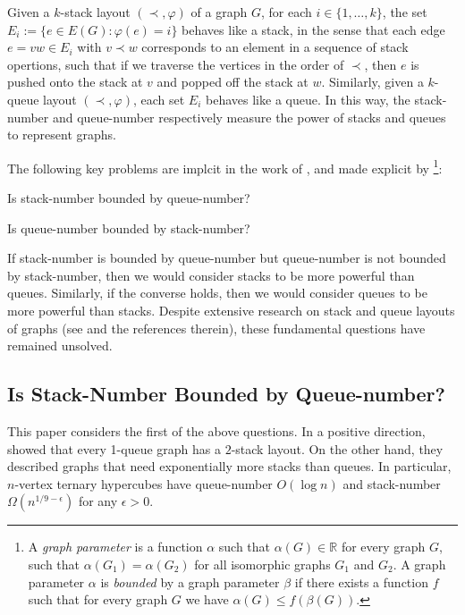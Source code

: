 \documentclass[kpfonts]{patmorin}
\renewcommand{\leq}{\leqslant}
\begin{document}
Given a $k$-stack layout $(\prec,\varphi)$ of a graph $G$, for each $i\in\{1,\dots,k\}$, the set $E_i:= \{e\in E(G):\varphi(e)=i\}$ behaves like a stack, in the sense that each edge $e=vw \in E_i$ with $v\prec w$ corresponds to an element in a sequence of stack opertions, such that if we traverse the vertices in the order of $\prec$, then $e$ is pushed onto the stack at $v$ and popped off the stack at $w$. Similarly, given a $k$-queue layout $(\prec,\varphi)$, each set $E_i$ behaves like a queue. In this way, the stack-number and queue-number  respectively measure the power of stacks and queues to represent graphs.


The following key problems are implcit in the work of \citet{HLR92}, and made explicit by \citet{DujWoo05}
\footnote{A \emph{graph parameter} is a function $\alpha$ such that $\alpha(G)\in\mathbb{R}$ for every graph $G$, such that $\alpha(G_1)=\alpha(G_2)$ for all isomorphic graphs $G_1$ and $G_2$. A graph parameter $\alpha$ is \textit{bounded} by a graph parameter $\beta$ if there exists a function $f$ such that for every graph $G$ we have $\alpha(G) \leq f(\beta(G))$.}:
\begin{compactitem}
	\item Is stack-number bounded by queue-number?
	\item Is queue-number bounded by stack-number?
\end{compactitem}

If stack-number is bounded by queue-number but queue-number is not bounded by stack-number, then we would consider stacks to be more powerful than queues. Similarly, if the converse holds, then we would consider queues to be more powerful than stacks. Despite extensive research on stack and queue layouts of graphs (see \citep{DujWoo04,DujWoo-DCG07,DJMMUW20} and the references therein), these fundamental questions have remained unsolved.

\subsection*{Is Stack-Number Bounded by Queue-number?}

This paper considers the first of the above questions. In a positive direction, \citet{HLR92}  showed that every 1-queue graph has a $2$-stack layout. On the other hand, they described graphs that need exponentially more stacks than queues. In particular, $n$-vertex ternary hypercubes have queue-number $O(\log n)$ and stack-number $\Omega(n^{1/9-\epsilon})$ for any $\epsilon>0$.
\end{document}
